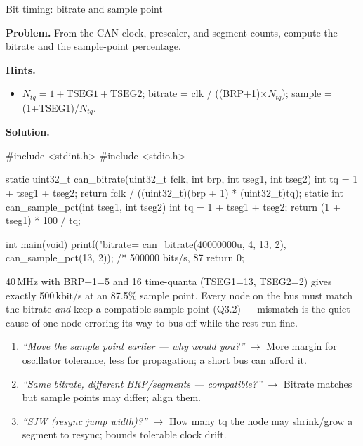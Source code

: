 \begin{gymproblem}{Bit timing: bitrate and sample point}

\textbf{Problem.} From the CAN clock, prescaler, and segment counts, compute the
bitrate and the sample-point percentage.

\textbf{Hints.}
\begin{itemize}
\item $N_{tq}=1+\text{TSEG1}+\text{TSEG2}$; bitrate = clk / ((BRP+1)$\times
  N_{tq}$); sample = (1+TSEG1)/$N_{tq}$.
\end{itemize}

\attempt

\textbf{Solution.}
\begin{cgym}
#include <stdint.h>
#include <stdio.h>

static uint32_t can_bitrate(uint32_t fclk, int brp, int tseg1, int tseg2) {
    int tq = 1 + tseg1 + tseg2;
    return fclk / ((uint32_t)(brp + 1) * (uint32_t)tq);
}
static int can_sample_pct(int tseg1, int tseg2) {
    int tq = 1 + tseg1 + tseg2;
    return (1 + tseg1) * 100 / tq;
}

int main(void) {
    printf("bitrate=%
           can_bitrate(40000000u, 4, 13, 2), can_sample_pct(13, 2));
    /* 500000 bits/s, 87%
    return 0;
}
\end{cgym}

40\,MHz with BRP+1=5 and 16 time-quanta (TSEG1=13, TSEG2=2) gives exactly
500\,kbit/s at an 87.5\% sample point. Every node on the bus must match the
bitrate \emph{and} keep a compatible sample point (Q3.2) --- mismatch is the
quiet cause of one node erroring its way to bus-off while the rest run fine.

\followups
\begin{enumerate}
\item \emph{``Move the sample point earlier --- why would you?''} $\rightarrow$
  More margin for oscillator tolerance, less for propagation; a short bus can
  afford it.
\item \emph{``Same bitrate, different BRP/segments --- compatible?''}
  $\rightarrow$ Bitrate matches but sample points may differ; align them.
\item \emph{``SJW (resync jump width)?''} $\rightarrow$ How many tq the node may
  shrink/grow a segment to resync; bounds tolerable clock drift.
\end{enumerate}
\end{gymproblem}

